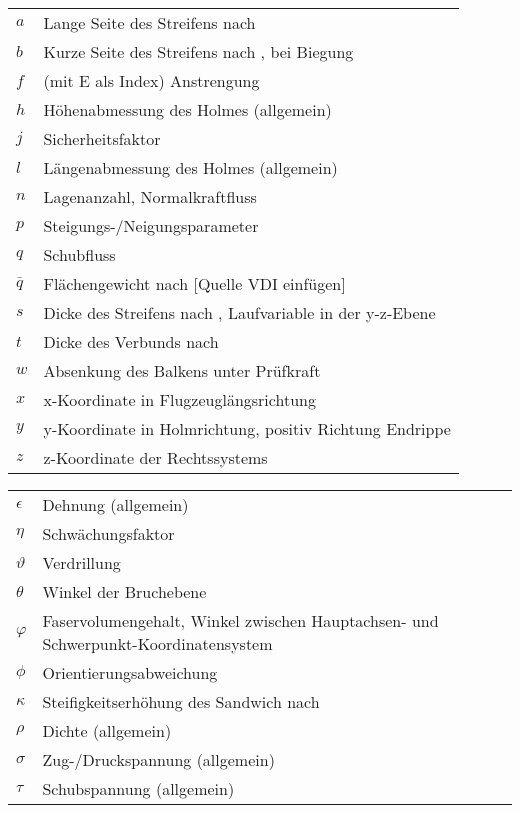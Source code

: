 \begin{table}[h]
	\begin{tabular}{ll}
		$ a $&Lange Seite des Streifens nach \cite{item1}\\
		$ b $&Kurze Seite des Streifens nach \cite{item1}, bei Biegung\\
		$ f $&(mit E als Index) Anstrengung\\
		$ h $&Höhenabmessung des Holmes (allgemein)\\
		$ j $&Sicherheitsfaktor\\
		$ l $&Längenabmessung des Holmes (allgemein)\\
		$ n $&Lagenanzahl, Normalkraftfluss\\
		$ p $&Steigungs-/Neigungsparameter\\
		$ q $&Schubfluss\\
		$ \bar{q} $&Flächengewicht nach [Quelle VDI einfügen]\\
		$ s $&Dicke des Streifens nach \cite{item1}, Laufvariable in der	y-z-Ebene\\
		$ t $&Dicke des Verbunds nach \cite{item3}\\
		$ w $&Absenkung des Balkens unter Prüfkraft\\
		$ x $&x-Koordinate in Flugzeuglängsrichtung\\
		$ y $&y-Koordinate in Holmrichtung, positiv Richtung Endrippe\\
		$ z $&z-Koordinate der Rechtssystems\\
		
	\end{tabular}
\end{table}

\begin{table}[h]
	\begin{tabular}{ll}
		$ \epsilon $&Dehnung (allgemein)\\
		$ \eta $&Schwächungsfaktor\\
		$ \vartheta $&Verdrillung\\
		$ \theta $ &Winkel der Bruchebene\\
		$ \varphi $&Faservolumengehalt, Winkel zwischen Hauptachsen- und Schwerpunkt-Koordinatensystem\\
		$ \phi $&Orientierungsabweichung\\
		$ \kappa $&Steifigkeitserhöhung des Sandwich nach \cite{item1}\\
		$ \rho $&Dichte (allgemein)\\
		$ \sigma $&Zug-/Druckspannung (allgemein)\\
		$ \tau $&Schubspannung (allgemein)\\
	\end{tabular}
\end{table}


